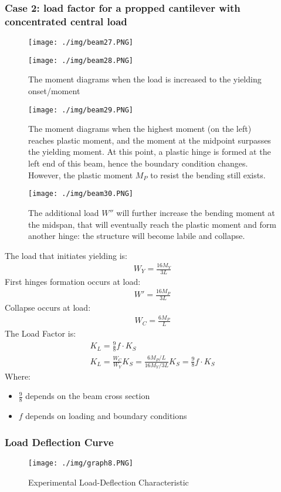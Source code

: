 \subsubsection{\large Case 2: load factor for a propped cantilever with concentrated central load}
\begin{figure}[H]
  \centering
  \texttt{[image: ./img/beam27.PNG]}
\end{figure}
\begin{figure}[H]
  \centering
  \texttt{[image: ./img/beam28.PNG]}
  \caption{The moment diagrams when the load is increased to the yielding onset/moment}
\end{figure}
\begin{figure}[H]
  \centering
  \texttt{[image: ./img/beam29.PNG]}
  \caption{The moment diagrams when the highest moment (on the left) reaches plastic moment, and the moment at the midpoint surpasses the yielding moment. At this point, a plastic hinge is formed at the left end of this beam, hence the boundary condition changes. However, the plastic moment $M_P$ to resist the bending still exists.}
\end{figure}
\begin{figure}[H]
  \centering
  \texttt{[image: ./img/beam30.PNG]}
  \caption{The additional load $W''$ will further increase the bending moment at the midspan, that will eventually reach the plastic moment and form another hinge: the structure will become labile and collapse.}
\end{figure}
The load that initiates yielding is:
\begin{gather}
  W_Y = \frac{16M_Y}{3L}
\end{gather}
First hinges formation occurs at load:
\begin{gather}
  W' = \frac{16M_P}{3L}
\end{gather}
Collapse occurs at load:
\begin{gather}
  W_C = \frac{6M_P}{L}
\end{gather}
The Load Factor is:
\begin{gather}
  K_L = \frac{9}{8}f\cdot K_S \\[5pt]
  K_L = \frac{W_C}{W_Y}K_S = \frac{6M_P/L}{16M_Y/3L}K_S = \frac{9}{8}f\cdot K_S
\end{gather}
Where:
\begin{itemize}
  \item $\frac{9}{8}$ depends on the beam cross section
  \item $f$ depends on loading and boundary conditions
\end{itemize}
\subsubsection{\large Load Deflection Curve}
\begin{figure}[H]
  \centering
  \texttt{[image: ./img/graph8.PNG]}
  \caption{Experimental Load-Deflection Characteristic}
\end{figure}